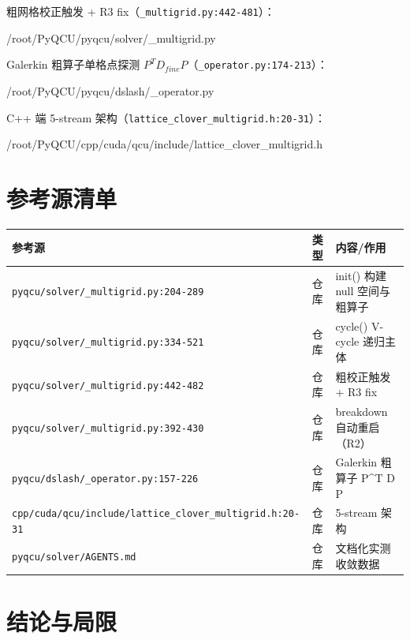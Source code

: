 \documentclass[UTF8]{ctexart}
\begin{document}
粗网格校正触发 + R3 fix（\texttt{\_multigrid.py:442-481}）：

\begin{lstinputlisting}[firstline=442,lastline=481,language=python]{/root/PyQCU/pyqcu/solver/_multigrid.py}
\end{lstinputlisting}

Galerkin 粗算子单格点探测 $P^T D_{fine} P$（\texttt{\_operator.py:174-213}）：

\begin{lstinputlisting}[firstline=174,lastline=213,language=python]{/root/PyQCU/pyqcu/dslash/_operator.py}
\end{lstinputlisting}

C++ 端 5-stream 架构（\texttt{lattice\_clover\_multigrid.h:20-31}）：

\begin{lstinputlisting}[firstline=20,lastline=31,language=c++]{/root/PyQCU/cpp/cuda/qcu/include/lattice_clover_multigrid.h}
\end{lstinputlisting}

\section{参考源清单}

\begin{xltabular}{\textwidth}{llX}
\toprule
\textcolor{evidence}{参考源} & 类型 & 内容/作用 \\
\midrule
\endhead
\texttt{\nolinkurl{pyqcu/solver/_multigrid.py:204-289}} & 仓库 & init() 构建 null 空间与粗算子 \\
\texttt{\nolinkurl{pyqcu/solver/_multigrid.py:334-521}} & 仓库 & cycle() V-cycle 递归主体 \\
\texttt{\nolinkurl{pyqcu/solver/_multigrid.py:442-482}} & 仓库 & 粗校正触发 + R3 fix \\
\texttt{\nolinkurl{pyqcu/solver/_multigrid.py:392-430}} & 仓库 & breakdown 自动重启（R2） \\
\texttt{\nolinkurl{pyqcu/dslash/_operator.py:157-226}} & 仓库 & Galerkin 粗算子 P\^{}T D P \\
\texttt{\nolinkurl{cpp/cuda/qcu/include/lattice_clover_multigrid.h:20-31}} & 仓库 & 5-stream 架构 \\
\texttt{\nolinkurl{pyqcu/solver/AGENTS.md}} & 仓库 & 文档化实测收敛数据 \\
\bottomrule
\end{xltabular}

\section{结论与局限}
\end{document}
